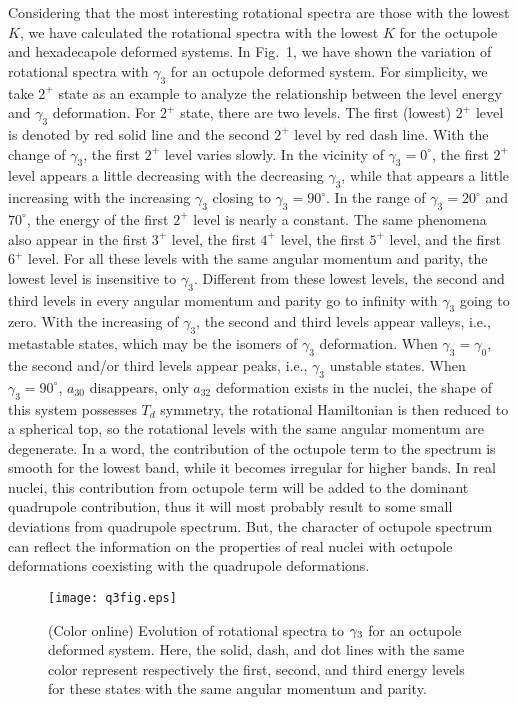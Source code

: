 \documentclass[twocolumn,prc,showpacs,preprintnumbers,superscriptaddress,floatfix]{revtex4}
\begin{document}
Considering that the most interesting rotational spectra are those with the
lowest $K$, we have calculated the rotational spectra with the lowest $K$
for the octupole and hexadecapole deformed systems. In Fig.~1, we have shown
the variation of rotational spectra with $\gamma _{3}$ for an octupole
deformed system. For simplicity, we take $2^{+}$ state as an example to
analyze the relationship between the level energy and $\gamma _{3}$
deformation. For $2^{+}$ state, there are two levels. The first (lowest) $%
2^{+}$ level is denoted by red solid line and the second $2^{+}$ level by
red dash line. With the change of $\gamma _{3}$, the first $2^{+}$ level
varies slowly. In the vicinity of $\gamma _{3}=0^{\circ }$, the first $2^{+}$
level appears a little decreasing with the decreasing $\gamma _{3}$, while
that appears a little increasing with the increasing $\gamma _{3}$ closing
to $\gamma _{3}=90^{\circ }$. In the range of $\gamma _{3}=20^{\circ }$ and $%
70^{\circ }$, the energy of the first $2^{+}$ level is nearly a constant.
The same phenomena also appear in the first $3^{+}$ level, the first $4^{+}$
level, the first $5^{+}$ level, and the first $6^{+}$ level. For all these
levels with the same angular momentum and parity, the lowest level is
insensitive to $\gamma _{3}$. Different from these lowest levels, the second
and third levels in every angular momentum and parity go to infinity with $%
\gamma _{3}$ going to zero. With the increasing of $\gamma _{3}$, the second
and third levels appear valleys, i.e., metastable states, which may be the
isomers of $\gamma _{3}$ deformation. When $\gamma _{3}=\gamma _{0}$, the
second and/or third levels appear peaks, i.e., $\gamma _{3}$ unstable
states. When $\gamma _{3}=90^{\circ }$, $a_{30}$ disappears, only $a_{32}$
deformation exists in the nuclei, the shape of this system possesses $T_{d}$
symmetry, the rotational Hamiltonian is then reduced to a spherical top, so
the rotational levels with the same angular momentum are degenerate. In a
word, the contribution of the octupole term to the spectrum is smooth for
the lowest band, while it becomes irregular for higher bands. In real
nuclei, this contribution from octupole term will be added to the dominant
quadrupole contribution, thus it will most probably result to some small
deviations from quadrupole spectrum. But, the character of octupole spectrum
can reflect the information on the properties of real nuclei with octupole
deformations coexisting with the quadrupole deformations.

\begin{figure}[tbp]
\texttt{[image: q3fig.eps]}
\caption{(Color online) Evolution of rotational spectra to $\protect\gamma %
_{3}$ for an octupole deformed system. Here, the solid, dash, and dot lines
with the same color represent respectively the first, second, and third
energy levels for these states with the same angular momentum and parity.}
\end{figure}
\end{document}
